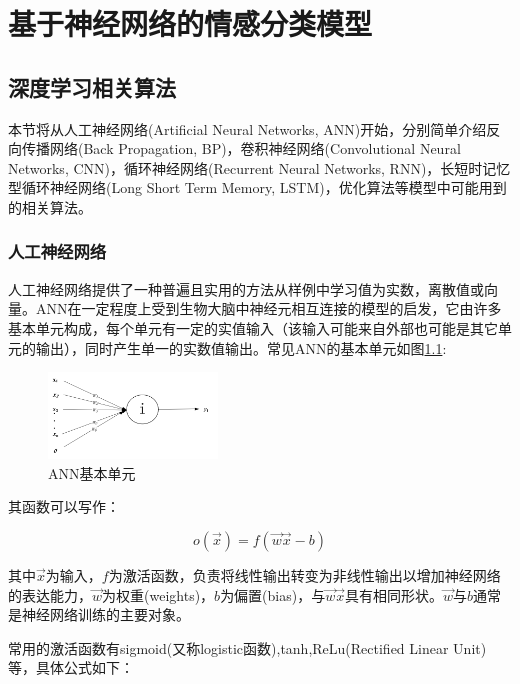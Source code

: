 \chapter{基于神经网络的情感分类模型}\thispagestyle{fancy}
\section{深度学习相关算法}
本节将从人工神经网络(Artificial Neural Networks, ANN)开始，分别简单介绍反向传播网络(Back Propagation, BP)，卷积神经网络(Convolutional Neural Networks, CNN)，循环神经网络(Recurrent Neural Networks, RNN)，长短时记忆型循环神经网络(Long Short Term Memory, LSTM)，优化算法等模型中可能用到的相关算法。
\subsection{人工神经网络}
人工神经网络提供了一种普遍且实用的方法从样例中学习值为实数，离散值或向量。ANN在一定程度上受到生物大脑中神经元相互连接的模型的启发，它由许多基本单元构成，每个单元有一定的实值输入（该输入可能来自外部也可能是其它单元的输出），同时产生单一的实数值输出。常见ANN的基本单元如图\ref{ann1}:
\begin{figure}[!hbp]
\begin{center}
\includegraphics[width=0.4\textwidth]{graphic/ann1.png}
\caption{ANN基本单元\cite{ml2006} \label{ann1}}
\end{center}
\end{figure}


其函数可以写作：


\begin{equation}
o(\vec{x}) = f(\vec{w} \vec{x} - b)
\end{equation}


其中$\vec{x}$为输入，$f$为激活函数，负责将线性输出转变为非线性输出以增加神经网络的表达能力，$\vec{w}$为权重(weights)，$b$为偏置(bias)，与$\vec{w} \vec{x} $具有相同形状。$\vec{w}$与$b$通常是神经网络训练的主要对象。


常用的激活函数有sigmoid(又称logistic函数),tanh,ReLu(Rectified Linear Unit)等，具体公式如下：


